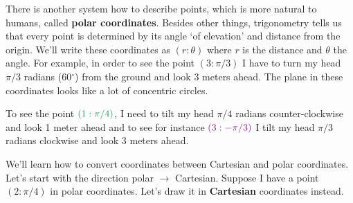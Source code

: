 \documentclass[a4paper,11pt]{article}
\newcommand{\clg}{\textcolor{ForestGreen}}
\newcommand{\clm}{\textcolor{Fuchsia}}
\begin{document}
There is another system how to describe points, which is more natural to humans,
called \textbf{polar coordinates}. Besides other things, trigonometry tells us
that every point is determined by its angle `of elevation' and distance from the
origin. We'll write these coordinates as $(r:\theta)$ where $r$ is the distance
and $\theta$ the angle. For example, in order to see the point $(3:\pi / 3)$ I
have to turn my head $\pi / 3$ radians (60$^{\circ}$) from the ground and look 3
meters ahead. The plane in these coordinates looks like a lot of concentric
circles.
\begin{center}
\end{center}
To see the point $\clg{(1:\pi / 4)}$, I need to tilt my head $\pi / 4$ radians
counter-clockwise and look 1 meter ahead and to see for instance $\clm{(3:-\pi /
3)}$ I tilt my head $\pi / 3$ radians clockwise and look 3 meters ahead.

We'll learn how to convert coordinates between Cartesian and polar coordinates.
Let's start with the direction polar $ \to $ Cartesian. Suppose I have a point
$(2:\pi / 4)$ in polar coordinates. Let's draw it in \textbf{Cartesian}
coordinates instead.
\end{document}
